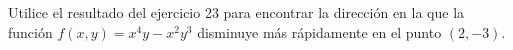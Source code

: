 \item Utilice el resultado del ejercicio 23 para encontrar la dirección en la que la función $f(x, y) = x^4y - x^2y^3$ disminuye más rápidamente en el punto $(2, -3)$.
